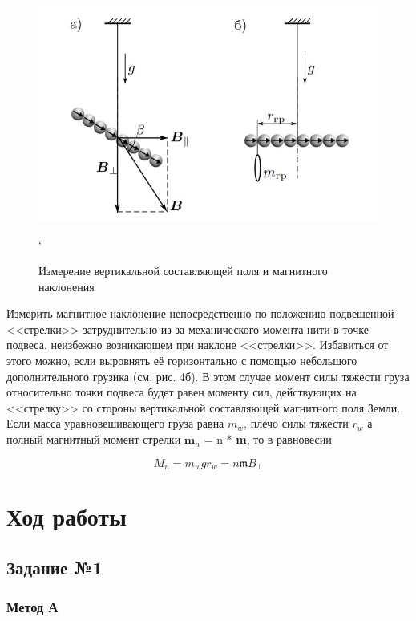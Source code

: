 \documentclass[a4paper,12pt]{article}
\begin{document}
\begin{figure}[h]
	\begin{center}
	\includegraphics[scale=0.5]{fig4}
	\end{center}
	\caption{Измерение вертикальной составляющей поля и магнитного наклонения}
`\end{figure}

Измерить магнитное наклонение непосредственно по положению подвешенной <<стрелки>> затруднительно из-за механического момента нити
в точке подвеса, неизбежно возникающем при наклоне <<стрелки>>. Избавиться от этого можно, если выровнять её горизонтально с помощью небольшого дополнительного грузика (см. рис. 4б). В этом случае момент силы тяжести груза относительно точки подвеса будет равен моменту сил, действующих на <<стрелку>> со стороны вертикальной составляющей магнитного поля Земли. Если масса уравновешивающего груза равна $m_w$, плечо силы тяжести $r_w$ а полный магнитный момент стрелки $\mathbf{m}_n$ = n * \textbf{m}, то в равновесии

\begin{equation}
	M_n = m_{w}gr_{w} = n \mathfrak{m}B_{\perp}
\end{equation}

\newpage

\section{Ход работы}

\subsection*{Задание №1}

\subsubsection*{Метод А}
\end{document}
